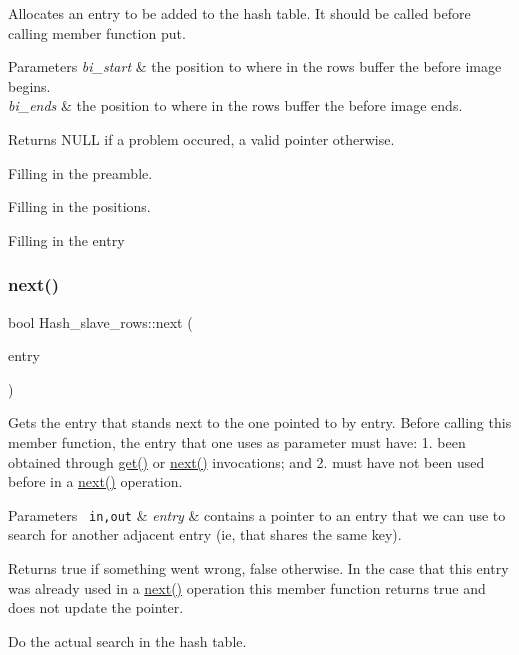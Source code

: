 Allocates an entry to be added to the hash table. It should be called before calling member function {\ttfamily put}.


\begin{DoxyParams}{Parameters}
{\em bi\+\_\+start} & the position to where in the rows buffer the before image begins. \\
\hline
{\em bi\+\_\+ends} & the position to where in the rows buffer the before image ends. \\
\hline
\end{DoxyParams}
\begin{DoxyReturn}{Returns}
N\+U\+LL if a problem occured, a valid pointer otherwise. 
\end{DoxyReturn}
Filling in the preamble.

Filling in the positions.

Filling in the entry\mbox{\label{classHash__slave__rows_a7194d9f4f783f2a0e95d7486f0a71a30}} 
\subsubsection{\texorpdfstring{next()}{next()}}
{\footnotesize\ttfamily bool Hash\+\_\+slave\+\_\+rows\+::next (\begin{DoxyParamCaption}\item[{\mbox{\hyperlink{structhash__row__entry__st}{H\+A\+S\+H\+\_\+\+R\+O\+W\+\_\+\+E\+N\+T\+RY}} $\ast$$\ast$}]{entry }\end{DoxyParamCaption})}

Gets the entry that stands next to the one pointed to by entry. Before calling this member function, the entry that one uses as parameter must have\+: 1. been obtained through \mbox{\hyperlink{classHash__slave__rows_a3f341c89bba321288653e82ea6bfe509}{get()}} or \mbox{\hyperlink{classHash__slave__rows_a7194d9f4f783f2a0e95d7486f0a71a30}{next()}} invocations; and 2. must have not been used before in a \mbox{\hyperlink{classHash__slave__rows_a7194d9f4f783f2a0e95d7486f0a71a30}{next()}} operation.


\begin{DoxyParams}[1]{Parameters}
\mbox{\texttt{ in,out}}  & {\em entry} & contains a pointer to an entry that we can use to search for another adjacent entry (ie, that shares the same key).\\
\hline
\end{DoxyParams}
\begin{DoxyReturn}{Returns}
true if something went wrong, false otherwise. In the case that this entry was already used in a \mbox{\hyperlink{classHash__slave__rows_a7194d9f4f783f2a0e95d7486f0a71a30}{next()}} operation this member function returns true and does not update the pointer. 
\end{DoxyReturn}
Do the actual search in the hash table.

